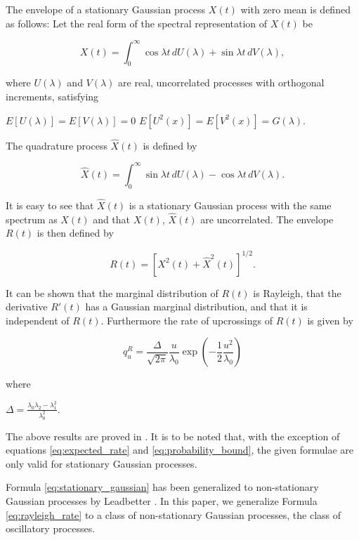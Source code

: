 \documentclass{article}
\begin{document}
The envelope of a stationary Gaussian process $X(t)$ with zero mean is defined as follows:
Let the real form of the spectral representation of $X(t)$ be

\begin{equation}
\label{eq:real_form_spectral}
X(t) = \int_0^{\infty} \cos \lambda t \, dU(\lambda) + \sin \lambda t \, dV(\lambda),
\end{equation}

where $U(\lambda)$ and $V(\lambda)$ are real, uncorrelated processes with orthogonal increments, satisfying

$E[U(\lambda)] = E[V(\lambda)] = 0$
$E[U^2(x)] = E[V^2(x)] = G(\lambda)$.

The quadrature process $\hat{X}(t)$ is defined by

\begin{equation}
\label{eq:quadrature_process}
\hat{X}(t) = \int_0^{\infty} \sin \lambda t \, dU(\lambda) - \cos \lambda t \, dV(\lambda).
\end{equation}

It is easy to see that $\hat{X}(t)$ is a stationary Gaussian process with the same spectrum as $X(t)$ and that $X(t)$, $\hat{X}(t)$ are uncorrelated. The envelope $R(t)$ is then defined by

\begin{equation}
\label{eq:envelope}
R(t) = [X^2(t) + \hat{X}^2(t)]^{1/2}.
\end{equation}

It can be shown that the marginal distribution of $R(t)$ is Rayleigh, that the derivative $R'(t)$ has a Gaussian marginal distribution, and that it is independent of $R(t)$. Furthermore the rate of upcrossings of $R(t)$ is given by

\begin{equation}
\label{eq:rayleigh_rate}
q_u^R = \frac{\Delta}{\sqrt{2\pi}} \frac{u}{\lambda_0} \exp \left(-\frac{1}{2} \frac{u^2}{\lambda_0}\right)
\end{equation}

where

$\Delta = \frac{\lambda_0\lambda_2-\lambda_1^2}{\lambda_0^2}$.

The above results are proved in \cite{cramer1967}. It is to be noted that, with the exception of equations \ref{eq:expected_rate} and \ref{eq:probability_bound}, the given formulae are only valid for stationary Gaussian processes.

Formula \ref{eq:stationary_gaussian} has been generalized to non-stationary Gaussian processes by Leadbetter \cite{leadbetter1966}. In this paper, we generalize Formula \ref{eq:rayleigh_rate} to a class of non-stationary Gaussian processes, the class of oscillatory processes.
\end{document}

